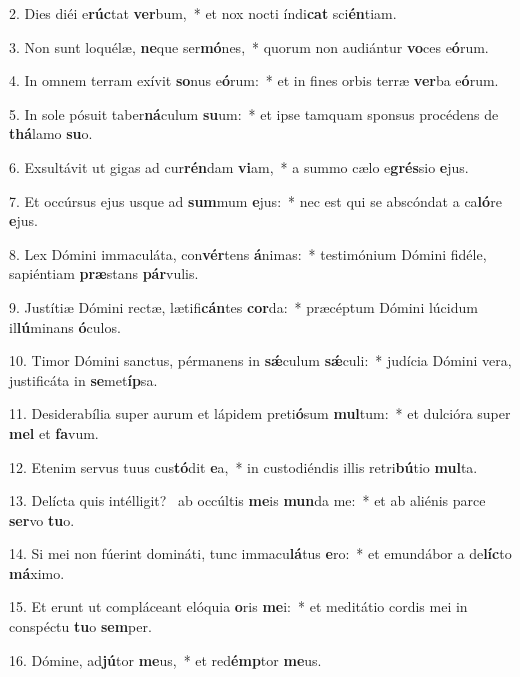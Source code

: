 2. Dies diéi e\textbf{rúc}tat \textbf{ver}bum,~*  et nox nocti índi\textbf{cat} sci\textbf{én}tiam.\

3. Non sunt loquélæ, \textbf{ne}que ser\textbf{mó}nes,~*  quorum non audiántur \textbf{vo}ces e\textbf{ó}rum.\

4. In omnem terram exívit \textbf{so}nus e\textbf{ó}rum:~*  et in fines orbis terræ \textbf{ver}ba e\textbf{ó}rum.\

5. In sole pósuit taber\textbf{ná}culum \textbf{su}um:~*  et ipse tamquam sponsus procédens de \textbf{thá}lamo \textbf{su}o.\

6. Exsultávit ut gigas ad cur\textbf{rén}dam \textbf{vi}am,~*  a summo cælo e\textbf{grés}sio \textbf{e}jus.\

7. Et occúrsus ejus usque ad \textbf{sum}mum \textbf{e}jus:~*  nec est qui se abscóndat a ca\textbf{ló}re \textbf{e}jus.\

8. Lex Dómini immaculáta, con\textbf{vér}tens \textbf{á}nimas:~*  testimónium Dómini fidéle, sapiéntiam \textbf{præ}stans \textbf{pár}vulis.\

9. Justítiæ Dómini rectæ, lætifi\textbf{cán}tes \textbf{cor}da:~*  præcéptum Dómini lúcidum il\textbf{lú}minans \textbf{ó}culos.\

10. Timor Dómini sanctus, pérmanens in \textbf{sǽ}culum \textbf{sǽ}culi:~*  judícia Dómini vera, justificáta in \textbf{se}met\textbf{íp}sa.\

11. Desiderabília super aurum et lápidem preti\textbf{ó}sum \textbf{mul}tum:~*  et dulcióra super \textbf{mel} et \textbf{fa}vum.\

12. Etenim servus tuus cus\textbf{tó}dit \textbf{e}a,~*  in custodiéndis illis retri\textbf{bú}tio \textbf{mul}ta.\

13. Delícta quis intélligit? \dag\  ab occúltis \textbf{me}is \textbf{mun}da me:~*  et ab aliénis parce \textbf{ser}vo \textbf{tu}o.\

14. Si mei non fúerint domináti, tunc immacu\textbf{lá}tus \textbf{e}ro:~*  et emundábor a de\textbf{líc}to \textbf{má}ximo.\

15. Et erunt ut compláceant elóquia \textbf{o}ris \textbf{me}i:~*  et meditátio cordis mei in conspéctu \textbf{tu}o \textbf{sem}per.\

16. Dómine, ad\textbf{jú}tor \textbf{me}us,~*  et red\textbf{émp}tor \textbf{me}us.\

